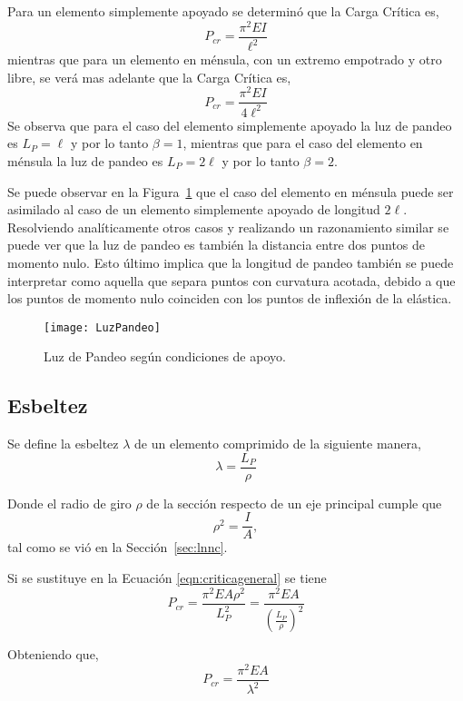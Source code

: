 Para un elemento simplemente apoyado se determinó que la Carga Crítica es,
$$P_{cr} = \frac{\pi^2 E I}{\ell^2}$$
mientras que para un elemento en ménsula, con un extremo empotrado y otro libre, se verá mas adelante que la Carga Crítica es,
$$P_{cr} = \frac{\pi^2 E I}{4\ell^2}$$
Se observa que para el caso del elemento simplemente apoyado la luz de pandeo es $L_P=\ell$ y por lo tanto $\beta=1$, mientras que para el caso del elemento en ménsula la luz de pandeo es $L_P=2\ell$ y por lo tanto $\beta=2$. 

Se puede observar en la Figura~\ref{fig:luzpandeo} que el caso del elemento en ménsula puede ser asimilado al caso de un elemento simplemente apoyado de longitud $2\ell$. Resolviendo analíticamente otros casos y realizando un razonamiento similar se puede ver que la luz de pandeo es también la distancia entre dos puntos de momento nulo. Esto último implica que la longitud de pandeo también se puede interpretar como aquella que separa puntos con curvatura acotada, debido a que los puntos de momento nulo coinciden con los puntos de inflexión de la elástica.

\begin{figure}[htb]
	\centering
	\texttt{[image: LuzPandeo]}
	\caption{Luz de Pandeo según condiciones de apoyo.}
	\label{fig:luzpandeo}
\end{figure}

\subsection{Esbeltez}

Se define la esbeltez $\lambda$ de un elemento comprimido de la siguiente manera,
\begin{equation}
\lambda = \frac{L_P}{\rho}
\end{equation}

Donde el radio de giro $\rho$ de la sección respecto de un eje principal cumple que
\begin{equation}
\rho^2 = \frac{I}{A},
\end{equation}
tal como se vió en la Sección~\ref{sec:lnnc}.

Si se sustituye en la Ecuación \eqref{eqn:criticageneral} se tiene
$$
P_{cr} = \frac{\pi^2 E A \rho^2}{L_P^2} = \frac{\pi^2 E A}{\left(\frac{L_P}{\rho}\right)^2}
$$

Obteniendo que,
\begin{equation}
\boxed{P_{cr} = \frac{\pi^2 E A}{\lambda^2}}
\end{equation}

